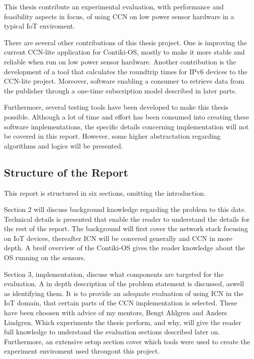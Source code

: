 This thesis contribute an experimental evaluation, with performance and feasibility aspects in focus, of using CCN on low power sensor hardware in a typical IoT enviroment.

There are several other contributions of this thesis project. One is improving the current CCN-lite application for Contiki-OS, mostly to make it more stable and reliable when run on low power sensor hardware. Another contribution is the development of a tool that calculates the roundtrip times for IPv6 devices to the CCN-lite project. Moreover, software enabling a consumer to retrieve data from the publisher through a one-time subscription model described in later parts.

Furthermore, several testing tools have been developed to make this thesis possible. Although a lot of time and effort has been consumed into creating these software implementations, the specific details concerning implementation will not be covered in this report. However, some higher abstractation regarding algorithms and logics will be presented.




\subsection{Structure of the Report}
This report is structured in six sections, omitting the introduction.

Section 2 will discuss background knowledge regarding the problem to this date. Technical details is presented that enable the reader to understand the details for the rest of the report. The background will first cover the network stack focusing on IoT devices, thereafter ICN will be convered generally and CCN in more depth. A breif overview of the Contiki-OS gives the reader knowledge about the OS running on the sensors.

Section 3, implementation, discuss what components are targeted for the evaluation. A in depth description of the problem statement is discussed, aswell as identifying them. It is to provide an adequate evaluation of using ICN in the IoT domain, that certain parts of the CCN implementation is selected. These have been choosen with advice of my mentors, Bengt Ahlgren and Anders Lindgren. Which experiments the thesis perform, and why, will give the reader full knowledge to understand the evaluation sections described later on. Furthermore, an extensive setup section cover which tools were used to create the experiment enviroment used througout this project.

